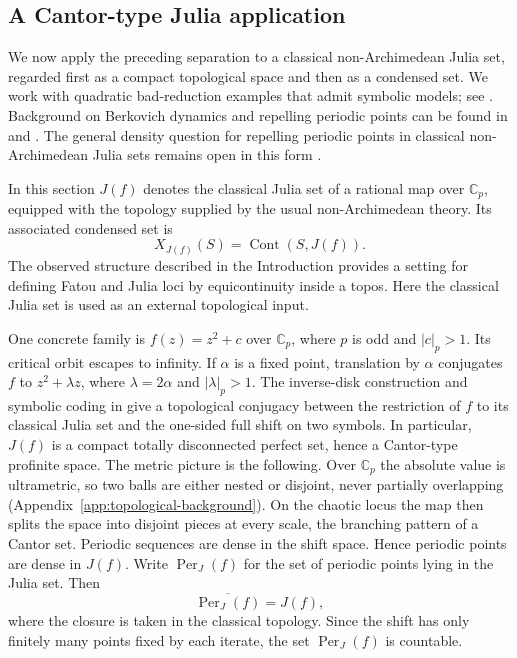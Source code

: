 \documentclass[10pt]{amsart}
\newcommand{\Cont}{\operatorname{Cont}}
\newcommand{\Per}{\operatorname{Per}}
\newcommand{\Cp}{\mathbb{C}_p}
\theoremstyle{plain}
\theoremstyle{definition}
\begin{document}
\subsection{A Cantor-type Julia application}
\label{sec:julia-cantor}

We now apply the preceding separation to a classical non-Archimedean Julia set,
regarded first as a compact topological space and then as a condensed set. We
work with quadratic bad-reduction examples that admit symbolic models; see
\cite[Example~5.29 and Exercise~8.19]{BenedettoNAM}. Background on Berkovich
dynamics and repelling periodic points can be found in
\cite[Ch.~12]{BenedettoNAM} and \cite{BakerRumely}. The general density question
for repelling periodic points in classical non-Archimedean Julia sets remains
open in this form \cite{OkuyamaRepelling}.

In this section $J(f)$ denotes the classical Julia set of a rational map over
$\Cp$, equipped with the topology supplied by the usual non-Archimedean theory.
Its associated condensed set is
\[
  X_{J(f)}(S)=\Cont(S,J(f)).
\]
The observed structure described in the Introduction provides a setting for
defining Fatou and Julia loci by equicontinuity inside a topos. Here the
classical Julia set is used as an external topological input.

One concrete family is $f(z)=z^2+c$ over $\Cp$, where $p$ is odd and
$|c|_p>1$. Its critical orbit escapes to infinity. If $\alpha$ is a fixed point,
translation by $\alpha$ conjugates $f$ to $z^2+\lambda z$, where
$\lambda=2\alpha$ and $|\lambda|_p>1$. The inverse-disk construction and
symbolic coding in \cite[Example~5.29 and Exercise~8.19]{BenedettoNAM} give a
topological conjugacy between the restriction of $f$ to its classical Julia
set and the one-sided full shift on two symbols. In particular, $J(f)$ is a
compact totally disconnected perfect set, hence a Cantor-type profinite space.
The metric picture is the following. Over $\Cp$ the absolute value is ultrametric, so
two balls are either nested or disjoint, never partially overlapping
(Appendix~\ref{app:topological-background}). On the chaotic locus the map then
splits the space into disjoint pieces at every scale, the branching pattern of a
Cantor set. Periodic sequences are dense in the shift space. Hence periodic
points are dense in $J(f)$. Write
$\Per_J(f)$ for the set of periodic points lying in the Julia set. Then
\[
  \overline{\Per_J(f)}=J(f),
\]
where the closure is taken in the classical topology.
Since the shift has only finitely many points fixed by each iterate, the set
\(\Per_J(f)\) is countable.
\end{document}
